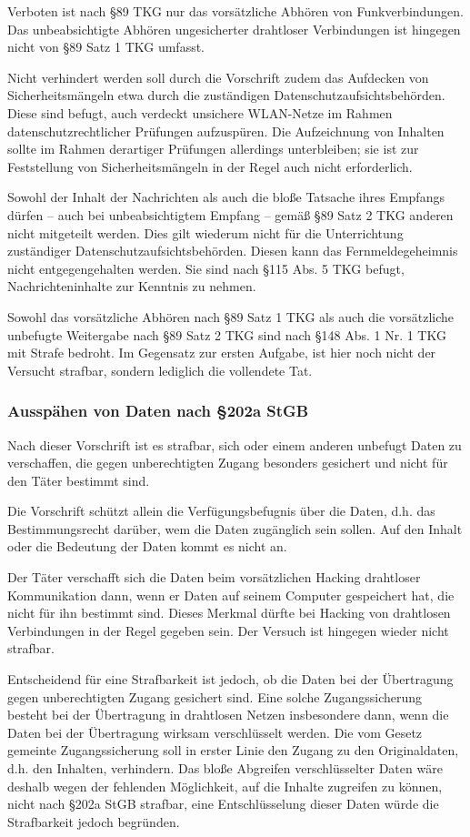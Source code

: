 \documentclass[10pt,a4paper]{article}
\begin{document}
Verboten ist nach §89 TKG nur das vorsätzliche Abhören von Funkverbindungen. Das unbeabsichtigte Abhören ungesicherter drahtloser Verbindungen ist hingegen nicht von §89 Satz 1 TKG umfasst.

Nicht verhindert werden soll durch die Vorschrift zudem das Aufdecken von Sicherheitsmängeln etwa durch die zuständigen Datenschutzaufsichtsbehörden. Diese sind befugt, auch verdeckt unsichere WLAN-Netze im Rahmen datenschutzrechtlicher Prüfungen aufzuspüren. Die Aufzeichnung von Inhalten sollte im Rahmen derartiger Prüfungen allerdings unterbleiben; sie ist zur Feststellung von Sicherheitsmängeln in der Regel auch nicht erforderlich.

Sowohl der Inhalt der Nachrichten als auch die bloße Tatsache ihres Empfangs dürfen – auch bei unbeabsichtigtem Empfang – gemäß §89 Satz 2 TKG anderen nicht mitgeteilt werden. Dies gilt wiederum nicht für die Unterrichtung zuständiger Datenschutzaufsichtsbehörden. Diesen kann das Fernmeldegeheimnis nicht entgegengehalten werden. Sie sind nach §115 Abs. 5 TKG befugt, Nachrichteninhalte zur Kenntnis zu nehmen.

Sowohl das vorsätzliche Abhören nach §89 Satz 1 TKG als auch die vorsätzliche unbefugte Weitergabe nach §89 Satz 2 TKG sind nach §148 Abs. 1 Nr. 1 TKG mit Strafe bedroht. Im Gegensatz zur ersten Aufgabe, ist hier noch nicht der Versucht strafbar, sondern lediglich die vollendete Tat.~\cite{Datenschutz}

\subsubsection*{Ausspähen von Daten nach §202a StGB}%
Nach dieser Vorschrift ist es strafbar, sich oder einem anderen unbefugt Daten zu verschaffen, die gegen unberechtigten Zugang besonders gesichert und nicht für den Täter bestimmt sind.

Die Vorschrift schützt allein die Verfügungsbefugnis über die Daten, d.h. das Bestimmungsrecht darüber, wem die Daten zugänglich sein sollen. Auf den Inhalt oder die Bedeutung der Daten kommt es nicht an.

Der Täter verschafft sich die Daten beim vorsätzlichen Hacking drahtloser Kommunikation dann, wenn er Daten auf seinem Computer gespeichert hat, die nicht für ihn bestimmt sind. Dieses Merkmal dürfte bei Hacking von drahtlosen Verbindungen in der Regel gegeben sein. Der Versuch ist hingegen wieder nicht strafbar.

Entscheidend für eine Strafbarkeit ist jedoch, ob die Daten bei der Übertragung gegen unberechtigten Zugang gesichert sind. Eine solche Zugangssicherung besteht bei der Übertragung in drahtlosen Netzen insbesondere dann, wenn die Daten bei der Übertragung wirksam verschlüsselt werden. Die vom Gesetz gemeinte Zugangssicherung soll in erster Linie den Zugang zu den Originaldaten, d.h. den Inhalten, verhindern. Das bloße Abgreifen verschlüsselter Daten wäre deshalb wegen der fehlenden Möglichkeit, auf die Inhalte zugreifen zu können, nicht nach §202a StGB strafbar, eine Entschlüsselung dieser Daten würde die Strafbarkeit jedoch begründen.
\end{document}
